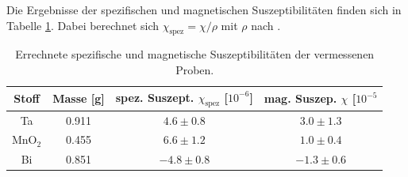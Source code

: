 \documentclass[12pt,a4paper,titlepage,headinclude,bibtotoc]{scrartcl}
\begin{document}
Die Ergebnisse der spezifischen und magnetischen Suszeptibilitäten finden sich in Tabelle \ref{tab:suszep}.
Dabei berechnet sich $\chi_\text{spez}=\chi/\rho$ mit $\rho$ nach \cite{formelsammlung}.

\begin{table}
	\centering
	\begin{tabular}{|c|c|c|c|}
		\hline
		Stoff 	& Masse [g]	& spez. Suszept. $\chi_\text{spez}$ [$10^{-6}$]	& mag. Suszep. $\chi$ [$10^{-5}$ \\\hline\hline
		Ta	& 0.911		& $4.6\pm 0.8$ 			& $3.0 \pm 1.3$ \\\hline
		MnO$_2$	& 0.455		& $6.6 \pm 1.2$			& $1.0 \pm 0.4$ \\\hline
		Bi	& 0.851		& $-4.8 \pm 0.8 $		& $-1.3 \pm 0.6$\\\hline
	\end{tabular}
	\caption{Errechnete spezifische und magnetische Suszeptibilitäten der vermessenen Proben.}
	\label{tab:suszep}
\end{table}
\end{document}
